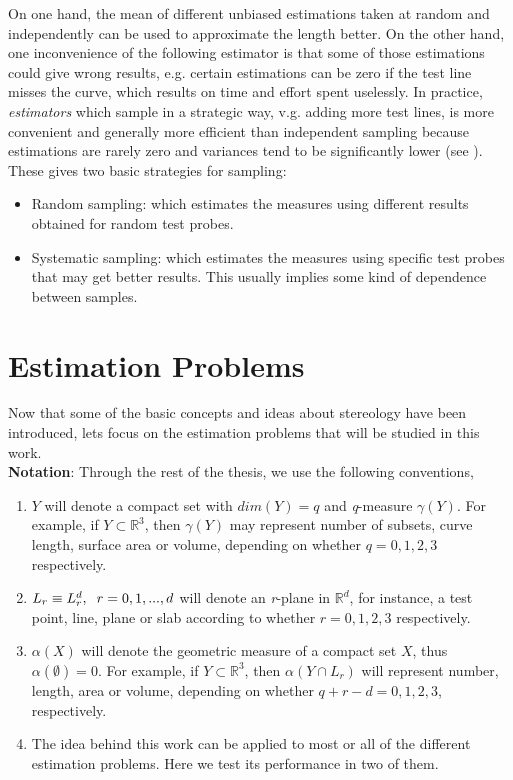 On one hand, the mean of different unbiased estimations taken at random and independently can be used to approximate the length better.
On the other hand, one inconvenience of the following estimator is that some of those estimations could give wrong results, e.g. certain estimations can be zero if the test line misses the curve, which results on time and effort spent uselessly. 
In practice, \textit{estimators} which sample in a strategic way, v.g. adding more test lines, is more convenient and generally more efficient than independent sampling because estimations are rarely zero and variances tend to be significantly lower (see \cite{CO.IAS.17.Hist.pdf}).\\

These gives two basic strategies for sampling:
\begin{itemize}
    \item Random sampling: which estimates the measures using different results obtained for random test probes.
    \item Systematic sampling:  which estimates the measures using specific test probes that may get better results. This usually implies some kind of dependence between samples.
\end{itemize}
\section{Estimation Problems}
Now that some of the basic concepts and ideas about stereology have been introduced, lets focus on the estimation problems that will be studied in this work.\\
\textbf{Notation}: 
Through the rest of the thesis, we use the following conventions,
\begin{enumerate}
    \item $Y$ will denote a compact set with $dim(Y)=q$ and \textit{q}-measure $\gamma(Y)$. For example, if $Y\subset \mathbb{R}^3$, then $\gamma(Y)$ may represent number of subsets, curve length, surface area or volume, depending on whether $q=0,1,2,3$ respectively.
    \item $L_r\equiv L_r^d, \hspace{2mm} r=0,1,...,d$ will denote an \textit{r}-plane in $\mathbb{R}^d$, for instance, a test point, line, plane or slab according to whether $r=0,1,2,3$ respectively.
    \item $\alpha(X)$ will denote the geometric measure of a compact set $X$, thus $\alpha(\emptyset)=0$. For example, if $Y\subset \mathbb{R}^3$, then $\alpha(Y\cap L_r)$ will represent number, length, area or volume, depending on whether $q+r-d=0,1,2,3$, respectively.
    \item The idea behind this work can be applied to most or all of the different estimation problems. Here we test its performance in two of them.
\end{enumerate}

